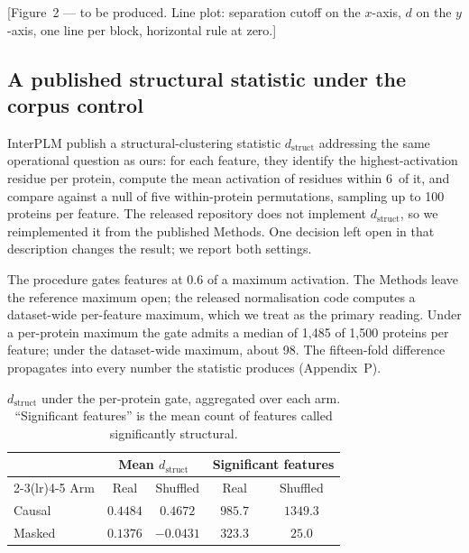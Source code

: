 \documentclass{article} %
\newcommand{\red}[1]{\textcolor{red}{#1}}
\newcommand{\opentag}[1]{\textcolor{red}{\textsuperscript{[\ref{#1}]}}}
\renewcommand{\red}[1]{#1}
\renewcommand{\opentag}[1]{}
\newcommand{\dstruct}{\ensuremath{d_{\mathrm{struct}}}}
\newcommand{\angstrom}{\text{\AA}}
\begin{document}
\red{[Figure~2 --- to be produced. Line plot: separation cutoff on the $x$-axis, $d$ on the
$y$-axis, one line per block, horizontal rule at zero.]}\opentag{fig:two}

\subsection{A published structural statistic under the corpus control}
\label{sec:dstruct}

InterPLM \citep{simon2025interplm} publish a structural-clustering statistic \dstruct{} addressing
the same operational question as ours: for each feature, they identify the highest-activation
residue per protein, compute the mean activation of residues within 6\,\angstrom{} of it, and
compare against a null of five within-protein permutations, sampling up to 100 proteins per
feature. The released repository does not implement \dstruct, so we reimplemented it from the
published Methods. One decision left open in that description changes the result; we report both
settings.

The procedure gates features at $0.6$ of a maximum activation. The Methods leave the reference
maximum open; the released normalisation code computes a dataset-wide per-feature maximum, which we
treat as the primary reading. Under a per-protein maximum the gate admits a median of 1{,}485 of
1{,}500 proteins per feature; under the dataset-wide maximum, about 98. The fifteen-fold difference
propagates into every number the statistic produces (Appendix~P).

\begin{table}[t]
\caption{\dstruct{} under the per-protein gate, aggregated over each arm. ``Significant features''
is the mean count of features called significantly structural.}
\label{tab:dstruct}
\begin{center}
\begin{tabular}{lcccc}
\toprule
& \multicolumn{2}{c}{Mean \dstruct} & \multicolumn{2}{c}{Significant features} \\
\cmidrule(lr){2-3}\cmidrule(lr){4-5}
Arm & Real & Shuffled & Real & Shuffled \\
\midrule
Causal & $0.4484$ & $0.4672$  & $985.7$ & $1349.3$ \\
Masked & $0.1376$ & $-0.0431$ & $323.3$ & $25.0$ \\
\bottomrule
\end{tabular}
\end{center}
\end{table}
\end{document}
